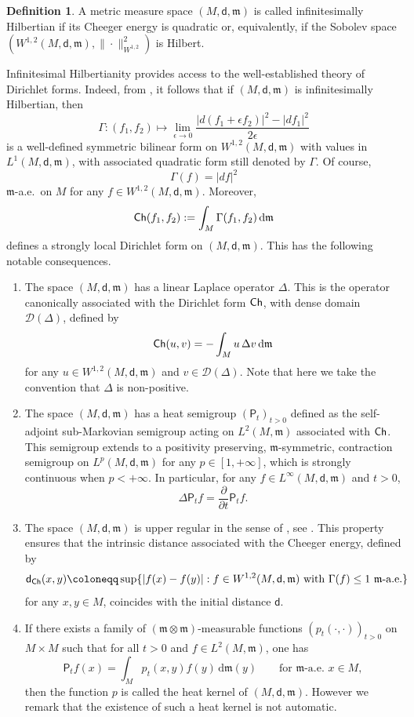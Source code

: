 \documentclass[10pt]{article}
\newcommand{\m}{\mathfrak{m}}
\newcommand{\M}{{\mathit{M}}}
\renewcommand{\d}{\,\mathrm{d}}
\newcommand{\D}{\mathscr{D}}
\renewcommand{\P}{\mathsf{P}}
\newcommand{\dist}{\mathsf{d}}
\newcommand{\df}{\coloneqq}
\newcommand{\Ch}{{\sf Ch}}
\theoremstyle{plain}
\theoremstyle{definition}
\newtheorem{definition}[theorem]{Definition}
\newcommand{\Ltwo}{L^2(M,\m)}
\newcommand{\Sob}{W^{1,2}(M,\dist,\m)}
\begin{document}
\begin{definition}
A metric measure space $(M,\dist,\m)$ is called 
infinitesimally Hilbertian if its Cheeger energy is quadratic or, equivalently, if the Sobolev space $(\Sob,\|\cdot\|^2_{W^{1,2}})$ is Hilbert.
\end{definition}

Infinitesimal Hilbertianity provides access to the well-established theory of Dirichlet forms. Indeed, from \cite[Theorem 4.18]{AGSDuke}, it follows that if $(M,\dist,\m)$ is infinitesimally Hilbertian, then
$$
\Gamma : ( f_1, f_2) \mapsto \lim_{\epsilon\to 0}\frac{|d (f_1+\epsilon f_2)|^2-|d f_1|^2}{2\epsilon}
$$
is a well-defined symmetric bilinear form on $\Sob$ with values in $L^1(\M,\dist,\m)$, with associated quadratic form still denoted by $\Gamma$. Of course, $$\Gamma(f)= |df|^2$$ $\m$-a.e.~on $M$ for any $f \in \Sob$. Moreover,
$$
\Ch(f_1,f_2) := \int_M \Gamma ( f_1,  f_2 ) \d \m
$$
defines a strongly local Dirichlet form on $(M,\dist,\m)$.  This has the following notable consequences. 

\begin{enumerate}
    \item The space $(M,\dist,\m)$ has a linear Laplace operator $\Delta$. This is the operator canonically associated with the Dirichlet form $\Ch$, with dense domain $\D(\Delta)$, defined by
\begin{align*}
    \Ch(u,v) = -\int_M u\,\Delta v\d\m
\end{align*}
for any $u \in \Sob$ and $v \in \D(\Delta)$. Note that here we take the convention that $\Delta$ is non-positive.
\item The space $(M,\dist,\m)$ has a heat semigroup $(\P_t)_{t > 0}$ defined as the self-adjoint sub-Markovian semigroup acting on $\Ltwo$ associated with $\Ch$. This semigroup extends to a positivity preserving, $\m$-symmetric, contraction semigroup on $L^p(\M,\dist,\m)$ for any $p \in [1,+\infty]$, which is strongly continuous when $p < +\infty$. In particular, for any $f \in L^\infty(\M,\dist,\m)$ and $t > 0$,
\[
\Delta \P_tf = \frac{\partial}{\partial t} \P_tf.
\]

\item The space $(M,\dist,\m)$ is upper regular in the sense of \cite[Definition 3.13]{AGSAnnProb}, see \cite[Section 8.3]{AGSIber}. This property ensures that the intrinsic distance associated with the Cheeger energy, defined by
\[
\dist_{\Ch} (x,y) \df \sup \{|f(x)-f(y)| : f \in \Sob \text{ with } \Gamma(f)\le 1 \text{ $\m$-a.e.} \}
\]
for any $x,y \in M$,
coincides with the initial distance $\dist$.
\item If there exists a family of $(\m\otimes\m)$-measurable functions $(p_t(\cdot,\cdot))_{t>0}$ on $M\times M$ such that for all $t>0$ and $f \in \Ltwo$, one has 
\[
\P_tf(x) = \int_Mp_t(x,y)f(y) \d \m(y) \qquad \text{for $\m$-a.e.~$x \in M$},
\]
then the function $p$ is called the heat kernel of $(M,\dist,\m)$. However we remark that the existence of such a heat kernel is not automatic. 
\end{enumerate} 
\end{document}
